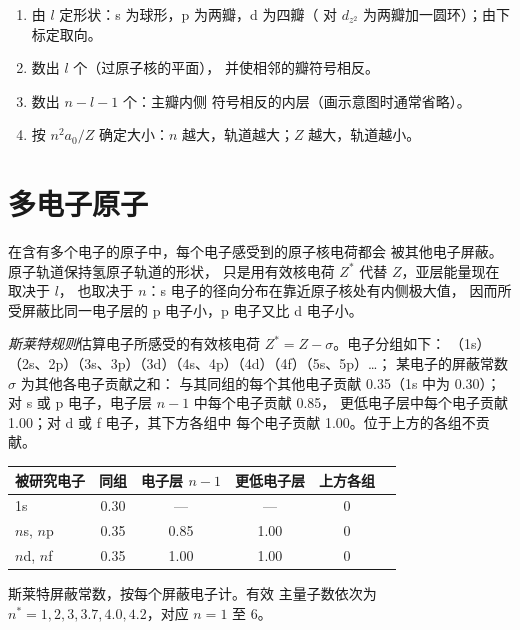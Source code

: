 \begin{method}[由量子数画原子轨道示意图]\label{met:b2:atomic-orbitals:draw-orbital}
\begin{enumerate}
  \item 由 $l$ 定形状：s 为球形，p 为两瓣，d 为四瓣（
        对 $d_{z^2}$ 为两瓣加一圆环）；由下标定取向。
  \item 数出 $l$ 个（过原子核的平面），
        并使相邻的瓣符号相反。
  \item 数出 $n - l - 1$ 个：主瓣内侧
        符号相反的内层（画示意图时通常省略）。
  \item 按 $n^2a_0/Z$ 确定大小：$n$ 越大，轨道越大；$Z$ 越大，轨道越小。
\end{enumerate}
\end{method}

\section{多电子原子}

在含有多个电子的原子中，每个电子感受到的原子核电荷都会
被其他电子屏蔽。原子轨道保持氢原子轨道的形状，
只是用有效核电荷 $Z^*$ 代替 $Z$，亚层能量现在取决于 $l$，
也取决于 $n$：s 电子的径向分布在靠近原子核处有内侧极大值，
因而所受屏蔽比同一电子层的 p 电子小，p 电子又比
d 电子小。

\begin{definition}[斯莱特规则]\label{def:b2:atomic-orbitals:slater}
\emph{斯莱特规则}估算电子所感受的有效核电荷
$Z^* = Z - \sigma$。电子分组如下：
（1s）（2s、2p）（3s、3p）（3d）（4s、4p）（4d）（4f）（5s、5p）\dots；
某电子的屏蔽常数 $\sigma$ 为其他各电子贡献之和：
与其同组的每个其他电子贡献 0.35（1s 中为 0.30）；
对 s 或 p 电子，电子层 $n - 1$ 中每个电子贡献 0.85，
更低电子层中每个电子贡献 1.00；对 d 或 f 电子，其下方各组中
每个电子贡献 1.00。位于上方的各组不贡献。
\end{definition}

\begin{omfigure}
\small
\renewcommand{\arraystretch}{1.2}
\begin{tabular}{l|ccccc}
被研究电子 & 同组 & 电子层 $n - 1$ & 更低电子层 & 上方各组 \\ \hline
1s & 0.30 & --- & --- & 0 \\
$n$s, $n$p & 0.35 & 0.85 & 1.00 & 0 \\
$n$d, $n$f & 0.35 & 1.00 & 1.00 & 0 \\
\end{tabular}

\smallskip
{\small 斯莱特屏蔽常数，按每个屏蔽电子计。有效
主量子数依次为 $n^* = 1, 2, 3, 3.7, 4.0, 4.2$，对应 $n = 1$ 至 6。}
\end{omfigure}

